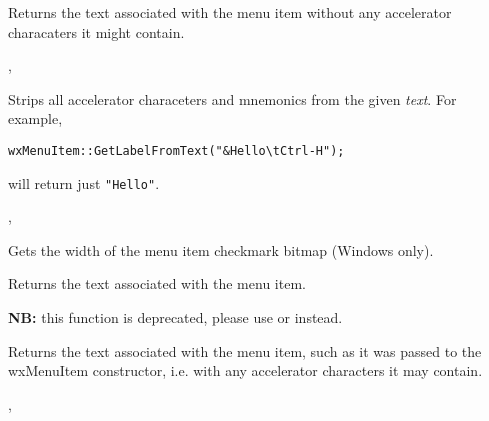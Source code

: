 \label{wxmenuitemgetlabel}


Returns the text associated with the menu item without any accelerator
characaters it might contain.


, 

\label{wxmenuitemgetlabelfromtext}


Strips all accelerator characeters and mnemonics from the given {\it text}.
For example,

\begin{verbatim}
wxMenuItem::GetLabelFromText("&Hello\tCtrl-H");
\end{verbatim}

will return just {\tt "Hello"}.


, 

\label{wxmenuitemgetmarginwidth}


Gets the width of the menu item checkmark bitmap (Windows only).

\label{wxmenuitemgetname}


Returns the text associated with the menu item.

{\bf NB:} this function is deprecated, please use 
 or  
instead.

\label{wxmenuitemgettext}


Returns the text associated with the menu item, such as it was passed to the
wxMenuItem constructor, i.e. with any accelerator characters it may contain.


, 

